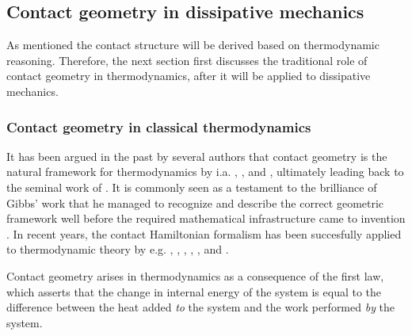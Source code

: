 
\subsection{Contact geometry in dissipative mechanics}
\label{ssec:contact_dissipation}
As mentioned the contact structure will be derived based on thermodynamic reasoning. Therefore, the next section first discusses the traditional role of contact geometry in thermodynamics, after it will be applied to dissipative mechanics.

\subsubsection{Contact geometry in classical thermodynamics}
It has been argued in the past by several authors that contact geometry is the natural framework for thermodynamics by i.a. \citet{Arnold1991,Arnold1989a,Arnold1989,Arnold1989b}, \citet{Bamberg1988}, \citet{Burke1985} and \citet{Hermann1973}, ultimately leading back to the seminal work of \citet{Gibbs1873}. It is commonly seen as a testament to the brilliance of Gibbs' work that he managed to recognize and describe the correct geometric framework well before the required mathematical infrastructure came to invention \cite{Wightman1979}. In recent years, the contact Hamiltonian formalism has been succesfully applied to thermodynamic theory by e.g. \citet{Mrugala1991,Mrugala2000,Mrugala1984,Mrugala1985,Mrugala1993,Mrugala1996}, \citet{Balian2001}, \citet{VanderSchaft2021a,VanderSchaft2018}, \citet{Maschke2018}, \citet{Bravetti2015}, and \citet{Simoes2020}. 

Contact geometry arises in thermodynamics as a consequence of the first law, which asserts that the change in internal energy of the system is equal to the difference between the heat added \emph{to} the system and the work performed \emph{by} the system. 


